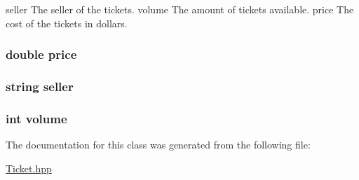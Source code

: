 seller The seller of the tickets. volume The amount of tickets available. price The cost of the tickets in dollars. \hypertarget{class_ticket_a80d1e9b73edf0b6c8aa055cb5cdaa2f2}{
\subsubsection[{price}]{\setlength{\rightskip}{0pt plus 5cm}double price\hspace{0.3cm}{\ttfamily [private]}}}\label{class_ticket_a80d1e9b73edf0b6c8aa055cb5cdaa2f2}
\hypertarget{class_ticket_a8cdc0977faad029fbb45ab09035319b9}{
\subsubsection[{seller}]{\setlength{\rightskip}{0pt plus 5cm}string seller\hspace{0.3cm}{\ttfamily [private]}}}\label{class_ticket_a8cdc0977faad029fbb45ab09035319b9}
\hypertarget{class_ticket_aed48ca0bcd2162fd4fd495873e2631f5}{
\subsubsection[{volume}]{\setlength{\rightskip}{0pt plus 5cm}int volume\hspace{0.3cm}{\ttfamily [private]}}}\label{class_ticket_aed48ca0bcd2162fd4fd495873e2631f5}


The documentation for this class was generated from the following file\-:\begin{DoxyCompactItemize}
\item 
\hyperlink{_ticket_8hpp}{Ticket.\-hpp}\end{DoxyCompactItemize}
